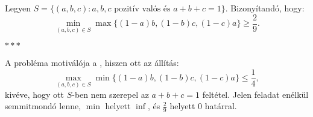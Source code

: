 Legyen $S=\{ (a,b,c): a,b,c \text{ pozitív valós és } a+b+c=1\}.$ Bizonyítandó, hogy:
$$
\min_{(a,b,c)\in S} \max\{ (1-a)b,(1-b)c,(1-c)a\} \ge \frac{2}{9}.
$$
\newline
\centerline{$***$}
\newline
A probléma motiválója a , hiszen ott az állítás:
$$
\max_{(a,b,c)\in S} \min\{ (1-a)b,(1-b)c,(1-c)a\} \le \frac{1}{4},
$$
kivéve, hogy ott $S$-ben nem szerepel az $a+b+c=1$ feltétel. Jelen feladat 
enélkül semmitmondó lenne, $\min$ helyett $\inf$, és $\frac{2}{9}$ helyett 
$0$ határral.



